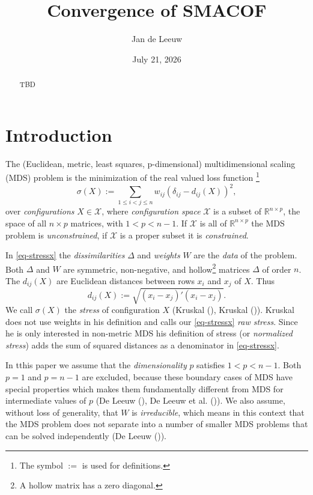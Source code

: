\documentclass[
  12pt,
  letterpaper,
  DIV=11,
  numbers=noendperiod]{scrartcl}
\title{Convergence of SMACOF}
\author{Jan de Leeuw}
\date{July 21, 2026}
\newcommand{\sectionbreak}{\clearpage}
\renewcommand*\contentsname{Table of contents}
\newcommand\contentsname{Table of contents}
\begin{document}
\maketitle
\begin{abstract}
TBD
\end{abstract}

\renewcommand*\contentsname{Table of contents}
{
\setcounter{tocdepth}{3}
\tableofcontents
}

\sectionbreak

\section{Introduction}\label{introduction}

The (Euclidean, metric, least squares, p-dimensional) multidimensional
scaling (MDS) problem is the minimization of the real valued loss
function \footnote{The symbol $:=$ is used for definitions.}
\begin{equation}
\sigma(X):=\mathop{\sum}_{1\leq i<j\leq n} w_{ij}(\delta_{ij}-d_{ij}(X))^2,
\label{eq-stressx}
\end{equation} over \emph{configurations} \(X\in\mathcal{X}\), where
\emph{configuration space} \(\mathcal{X}\) is a subset of
\(\mathbb{R}^{n\times p}\), the space of all \(n\times p\) matrices,
with \(1<p<n-1\). If \(\mathcal{X}\) is all of
\(\mathbb{R}^{n\times p}\) the MDS problem is \emph{unconstrained}, if
\(\mathcal{X}\) is a proper subset it is \emph{constrained}.

In \eqref{eq-stressx} the \emph{dissimilarities} \(\Delta\) and
\emph{weights} \(W\) are the \emph{data} of the problem. Both \(\Delta\)
and \(W\) are symmetric, non-negative, and
hollow\footnote{A hollow matrix has a zero diagonal.} matrices
\(\Delta\) of order \(n\). The \(d_{ij}(X)\) are Euclidean distances
between rows \(x_i\) and \(x_j\) of \(X\). Thus \begin{equation}
d_{ij}(X):=\sqrt{(x_{i}-x_{j})'(x_{i}-x_{j})}.\label{eq-ddef}
\end{equation} We call \(\sigma(X)\) the \emph{stress} of configuration
\(X\) (Kruskal (), Kruskal
()). Kruskal does not use weights in
his definition and calls our \eqref{eq-stressx} \emph{raw stress}. Since
he is only interested in non-metric MDS his definition of stress (or
\emph{normalized stress}) adds the sum of squared distances as a
denominator in \eqref{eq-stressx}.

In tthis paper we assume that the \emph{dimensionality} \(p\) satisfies
\(1<p<n-1\). Both \(p=1\) and \(p=n-1\) are excluded, because these
boundary cases of MDS have special properties which makes them
fundamentally different from MDS for intermediate values of \(p\) (De
Leeuw (), De Leeuw et al.
()). We also assume,
without loss of generality, that \(W\) is \emph{irreducible}, which
means in this context that the MDS problem does not separate into a
number of smaller MDS problems that can be solved independently (De
Leeuw ()).
\end{document}
